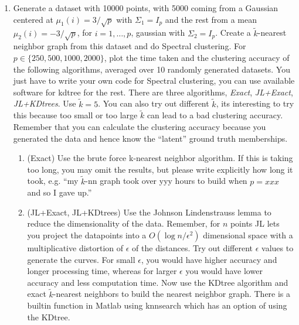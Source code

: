 \documentclass[11pt]{article}
\begin{document}
\begin{enumerate}

\begin{enumerate}
	\item Generate a dataset with 10000 points, with 5000 coming from a Gaussian centered at $\mu_1(i)=3/\sqrt{p}$  with $\Sigma_1=I_p$ and the rest from a mean $\mu_2(i)=-3/\sqrt{p}$, for $i=1,\dots,p$, gaussian with $\Sigma_2=I_p$. Create a $\tilde{k}$-nearest  neighbor graph from this dataset and do Spectral clustering. For $p\in\{250,500,1000,2000\}$, plot the time taken and the clustering accuracy of the following algorithms, averaged over 10 randomly generated datasets. You just have to write your own code for Spectral clustering, you can use available software for kdtree for the rest. There are three algorithms, \textit{Exact}, \textit{JL+Exact}, \textit{JL+KDtrees}. Use $\tilde{k}=5$. You can also try out different $\tilde{k}$, its interesting to try this because too small or too large $\tilde{k}$ can lead to a bad clustering accuracy. Remember that you can calculate the clustering accuracy because you generated the data and hence know the ``latent'' ground truth memberships.
\begin{enumerate}
	\item (Exact) Use the brute force k-nearest neighbor algorithm. If this is taking too long, you may omit the results, but please write explicitly how long it took, e.g. ``my $\tilde{k}$-nn graph took over yyy hours to build when $p=xxx$ and so I gave up.''
	\item (JL+Exact, JL+KDtrees) Use the Johnson Lindenstrauss lemma to reduce the dimensionality of the data. Remember, for $n$ points JL lets you project the datapoints into a $O(\log n/\epsilon^2)$ dimensional space with a multiplicative distortion of $\epsilon$ of the distances. Try out different $\epsilon$ values to generate the curves. For small $\epsilon$, you would have higher accuracy and longer processing time, whereas for larger $\epsilon$ you would have lower accuracy and less computation time. Now use the KDtree algorithm and exact $\tilde{k}$-nearest neighbors to build the nearest neighbor graph. There is a builtin function in Matlab using knnsearch which has an option of using the KDtree.
	\end{enumerate}
\end{enumerate}
\newcommand{\bx}{\boldsymbol{x}}
\newcommand{\bv}{\boldsymbol{v}}
\newcommand{\ba}{\boldsymbol{a}}


\end{enumerate}
\end{document}
